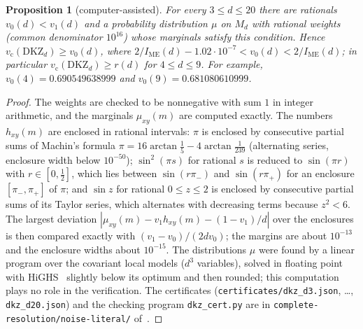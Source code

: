 \documentclass[11pt]{amsart}
\newtheorem{proposition}[theorem]{Proposition}
\theoremstyle{definition}
\theoremstyle{remark}
\numberwithin{equation}{section}
\newcommand{\IME}{I_{\mathrm{ME}}}
\newcommand{\vc}{v_{\mathrm c}}
\newcommand{\DKZ}{\mathrm{DKZ}}
\begin{document}
\begin{proposition}[computer-assisted]\label{prop:dkzcert}
For every $3\le d\le20$ there are rationals $v_0(d)<v_1(d)$ and a probability distribution $\mu$ on $M_d$ with rational
weights (common denominator $10^{16}$) whose marginals satisfy this condition. Hence $\vc(\DKZ_d)\ge v_0(d)$, where
$2/\IME(d)-1.02\cdot10^{-7}<v_0(d)<2/\IME(d)$; in particular $\vc(\DKZ_d)\ge r(d)$ for $4\le d\le9$. For example,
$v_0(4)=0.690549638999$ and $v_0(9)=0.681080610999$.
\end{proposition}

\begin{proof}
The weights are checked to be nonnegative with sum $1$ in integer arithmetic, and the marginals $\mu_{xy}(m)$ are
computed exactly. The numbers $h_{xy}(m)$ are enclosed in rational intervals: $\pi$ is enclosed by consecutive partial
sums of Machin's formula $\pi=16\arctan\frac15-4\arctan\frac1{239}$ (alternating series, enclosure width below
$10^{-50}$); $\sin^2(\pi s)$ for rational $s$ is reduced to $\sin(\pi r)$ with $r\in[0,\frac12]$, which lies between
$\sin(r\pi_-)$ and $\sin(r\pi_+)$ for an enclosure $[\pi_-,\pi_+]$ of $\pi$; and $\sin z$ for rational $0\le z\le2$ is
enclosed by consecutive partial sums of its Taylor series, which alternates with decreasing terms because $z^2<6$. The
largest deviation $|\mu_{xy}(m)-v_1h_{xy}(m)-(1-v_1)/d|$ over the enclosures is then compared exactly with
$(v_1-v_0)/(2dv_0)$; the margins are about $10^{-13}$ and the enclosure widths about $10^{-15}$. The distributions
$\mu$ were found by a linear program over the covariant local models ($d^3$ variables), solved in floating point
with HiGHS~\cite{HiGHS} slightly below its optimum and then rounded; this computation plays no role in the verification.
The certificates (\texttt{certificates/dkz\_d3.json}, \dots, \texttt{dkz\_d20.json}) and the checking program
\texttt{dkz\_cert.py} are in \texttt{complete-resolution/noise-literal/} of~\cite{repo-oqp27}.
\end{proof}
\end{document}
